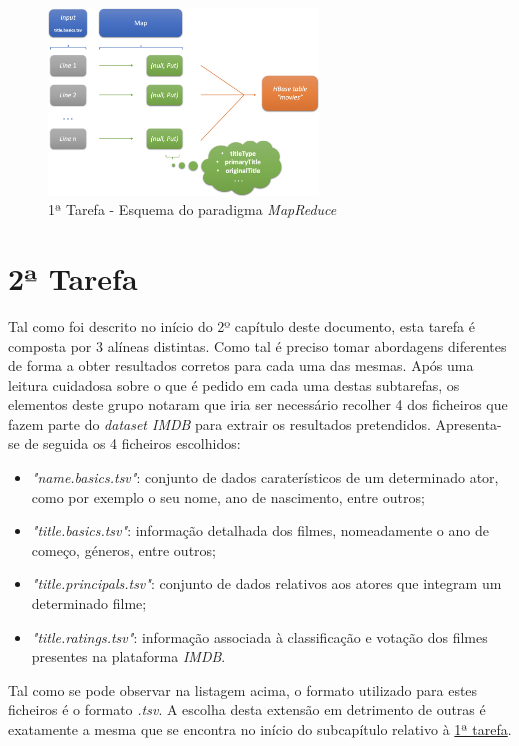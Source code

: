 \documentclass[a4paper]{report}
\begin{document}
{		\begin{figure}[H]
            \centering
            \includegraphics[width=0.64\textwidth]{Imagens/1ª Tarefa - Esquema MapReduce.png}
            \caption{1ª Tarefa - Esquema do paradigma \textit{MapReduce}}
            \label{fig:12}
        \end{figure}

	\section{2ª Tarefa} \label{sec:Task2}
	Tal como foi descrito no início do 2º capítulo deste documento, esta tarefa é composta por 3 alíneas distintas. Como tal é preciso tomar abordagens diferentes de forma a obter resultados corretos para cada uma das mesmas. 
	Após uma leitura cuidadosa sobre o que é pedido em cada uma destas subtarefas, os elementos deste grupo notaram que iria ser necessário recolher 4 dos ficheiros que fazem parte do \textit{dataset IMDB} para extrair os resultados pretendidos.
	Apresenta-se de seguida os 4 ficheiros escolhidos:
	\begin{itemize}
		\item \textit{"name.basics.tsv"}: conjunto de dados caraterísticos de um determinado ator, como por exemplo o seu nome, ano de nascimento, entre outros;
		\item \textit{"title.basics.tsv"}: informação detalhada dos filmes, nomeadamente o ano de começo, géneros, entre outros;
		\item \textit{"title.principals.tsv"}: conjunto de dados relativos aos atores que integram um determinado filme;
		\item \textit{"title.ratings.tsv"}: informação associada à classificação e votação dos filmes presentes na plataforma \textit{IMDB}.
	\end{itemize}
	
	Tal como se pode observar na listagem acima, o formato utilizado para estes ficheiros é o formato \textit{.tsv}. A escolha desta extensão em detrimento de outras é exatamente a mesma que se encontra no início do subcapítulo relativo à \hyperref[sec:Task1]{1ª tarefa}.
	
}
\end{document}
